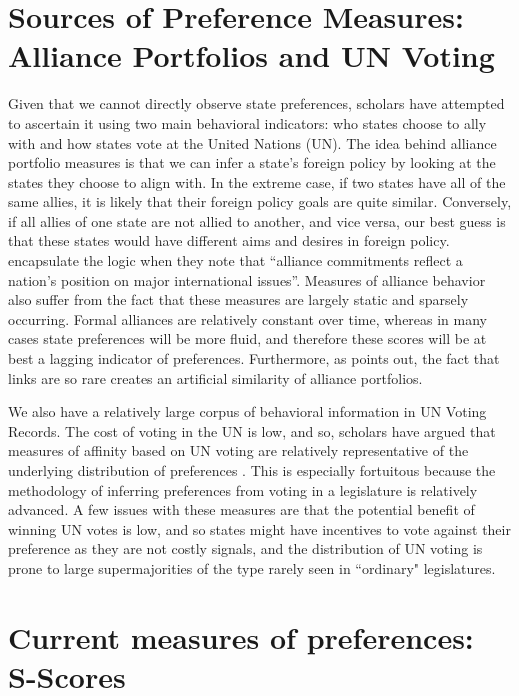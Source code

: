 \section*{Sources of Preference Measures: Alliance Portfolios and UN Voting}

Given that we cannot directly observe state preferences, scholars have attempted to ascertain it using two main behavioral indicators: who states choose to ally with and how states vote at the United Nations (UN). The idea behind alliance portfolio measures is that we can infer a state's foreign policy by looking at the states they choose to align with. In the extreme case, if two states have all of the same allies, it is likely that their foreign policy goals are quite similar. Conversely, if all allies of one state are not allied to another, and vice versa, our best guess is that these states would have different aims and desires in foreign policy. \citet{buenodemesquita:lalman:2008} encapsulate the logic when they note that ``alliance commitments reflect a nation's position on major international issues''. Measures of alliance behavior also suffer from the fact that these measures are largely static and sparsely occurring. Formal alliances are relatively constant over time, whereas in many cases state preferences will be more fluid, and therefore these scores will be at best a lagging indicator of preferences. Furthermore, as \citet{hage:2011} points out, the fact that links are so rare creates an artificial similarity of alliance portfolios.

We also have a relatively large corpus of behavioral information in UN Voting Records. The cost of voting in the UN is low, and so, scholars have argued that measures of affinity based on UN voting are relatively representative of the underlying distribution of preferences \citep{gartzke:1998}. This is especially fortuitous because the methodology of inferring preferences from voting in a legislature is relatively advanced. A few issues with these measures are that the potential benefit of winning UN votes is low, and so states might have incentives to vote against their preference as they are not costly signals, and the distribution of UN voting is prone to large supermajorities of the type rarely seen in ``ordinary" legislatures.

\section*{Current measures of preferences: S-Scores}

